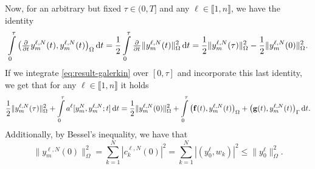 \documentclass[11pt]{article}
\newcommand{\llb}{\llbracket}
\newcommand{\rrb}{\rrbracket}
\numberwithin{equation}{section}
\begin{document}
	 Now, for an arbitrary but fixed \(\tau \in (0,T]\) and any \(\ell \in \llb 1,n\rrb\), we have the identity 
	 \[
	 	\int\limits_0^\tau \big(\pd{ }{t}  y_m^{\ell,N}(t),  y_m^{\ell,N} (t) \big)_\Omega \dif t
		=
		\frac{1}{2} \int\limits_0^\tau  \pd{ }{t} \|  y_m^{\ell,N}(t) \|_\Omega^2 \dif t
		=
		\frac{1}{2} \|  y_m^{\ell,N}(\tau) \|_\Omega^2 - \frac{1}{2} \|  y_m^{\ell,N}(0) \|_\Omega^2.
	 \]
	 If we integrate \eqref{eq:result-galerkin} over \([0,\tau]\) and incorporate this last identity, we get that for any \(\ell \in \llb 1,n\rrb\) it holds
	 \begin{align}
	 \label{eq:estimate-integrationbyparts}
	 	\frac{1}{2} \|  y_m^{\ell,N}(\tau) \|_\Omega^2
		+ 
		\int\limits_0^\tau a^\ell [ y_m^{N},  y_m^{\ell,N}; t] \dif t
		=
		\frac{1}{2} \|  y_m^{\ell,N}(0) \|_\Omega^2 + 
		\int\limits_0^\tau \big( \mathbf{f}(t),  y_m^{\ell,N} (t) \big)_{\Omega} + \big(\mathbf{g}(t),   y_m^{\ell,N} (t) \big)_\Gamma \dif t.
	 \end{align}
	Additionally, by Bessel's inequality, we have that
	\begin{equation}
	\label{eq:estimate-i}
		\|  y_m^{\ell,N}(0) \|_\Omega^2 = \sum_{k=1}^N |c_k^{\ell,N}(0)|^2 = \sum_{k=1}^N | (y_0^\ell, w_k) |^2 \leq \|y_0^\ell\|_\Omega^2.
	\end{equation}
	
	
	
\end{document}
